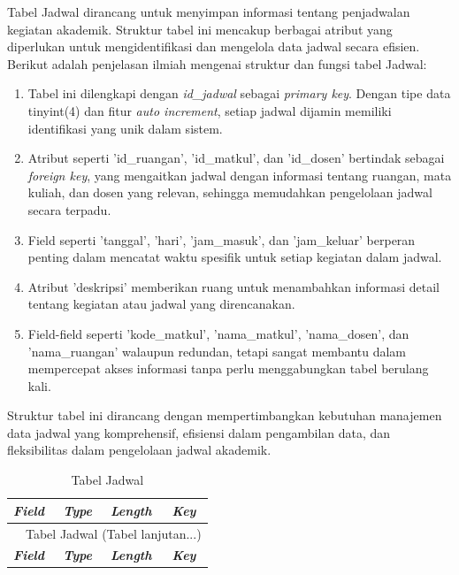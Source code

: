 \begin{enumerate}
	      Tabel Jadwal dirancang untuk menyimpan informasi tentang penjadwalan kegiatan akademik. Struktur tabel ini mencakup berbagai atribut yang diperlukan untuk mengidentifikasi dan mengelola data jadwal secara efisien. Berikut adalah penjelasan ilmiah mengenai struktur dan fungsi tabel Jadwal:

	      \begin{enumerate}[label=\alph*.]
		      \item Tabel ini dilengkapi dengan \textit{id\_jadwal} sebagai \textit{primary key}. Dengan tipe data tinyint(4) dan fitur \textit{auto increment}, setiap jadwal dijamin memiliki identifikasi yang unik dalam sistem.
		      \item Atribut seperti 'id\_ruangan', 'id\_matkul', dan 'id\_dosen' bertindak sebagai \textit{foreign key}, yang mengaitkan jadwal dengan informasi tentang ruangan, mata kuliah, dan dosen yang relevan, sehingga memudahkan pengelolaan jadwal secara terpadu.
		      \item Field seperti 'tanggal', 'hari', 'jam\_masuk', dan 'jam\_keluar' berperan penting dalam mencatat waktu spesifik untuk setiap kegiatan dalam jadwal.
		      \item Atribut 'deskripsi' memberikan ruang untuk menambahkan informasi detail tentang kegiatan atau jadwal yang direncanakan.
		      \item Field-field seperti 'kode\_matkul', 'nama\_matkul', 'nama\_dosen', dan 'nama\_ruangan' walaupun redundan, tetapi sangat membantu dalam mempercepat akses informasi tanpa perlu menggabungkan tabel berulang kali.
	      \end{enumerate}

	      Struktur tabel ini dirancang dengan mempertimbangkan kebutuhan manajemen data jadwal yang komprehensif, efisiensi dalam pengambilan data, dan fleksibilitas dalam pengelolaan jadwal akademik.

		      {
			      \fontsize{10}{12}\selectfont
			      \begin{longtable}{l l l l}
				      \caption{Tabel Jadwal}
				      \label{admin}                                                                                       \\
				      \hline
				      \textbf{\textit{Field}} & \textbf{\textit{Type}} & \textbf{\textit{Length}} & \textbf{\textit{Key}} \\
				      \hline
				      \endfirsthead

				      \multicolumn{4}{c}{\tablename\ \thetable\ {Tabel Jadwal} \space (Tabel lanjutan...)}                \\
				      \hline
				      \textbf{\textit{Field}} & \textbf{\textit{Type}} & \textbf{\textit{Length}} & \textbf{\textit{Key}} \\
				      \hline
				      \endhead


\end{longtable}}
\end{enumerate}
